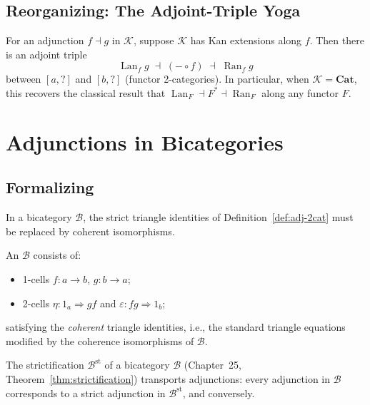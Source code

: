 \subsection{Reorganizing: The Adjoint-Triple Yoga}

\begin{theorem}
\label{thm:adj-triple}
For an adjunction $f \dashv g$ in $\mathcal{K}$, suppose $\mathcal{K}$ has
Kan extensions along $f$. Then there is an adjoint triple
\begin{equation*}
  \operatorname{Lan}_f g \;\dashv\; (- \circ f) \;\dashv\; \operatorname{Ran}_f g
\end{equation*}
between $[a, ?]$ and $[b, ?]$ (functor 2-categories). In particular, when
$\mathcal{K} = \mathbf{Cat}$, this recovers the classical result that
$\operatorname{Lan}_F \dashv F^* \dashv \operatorname{Ran}_F$ along any
functor $F$.
\end{theorem}


\section{Adjunctions in Bicategories}
\label{sec:adj-bicat}

\subsection{Formalizing}

In a bicategory $\mathcal{B}$, the strict triangle identities of
Definition~\ref{def:adj-2cat} must be replaced by coherent isomorphisms.

\begin{definition}
\label{def:adj-bicat}
An  $\mathcal{B}$ consists of:
\begin{itemize}
  \item 1-cells $f : a \to b$, $g : b \to a$;
  \item 2-cells $\eta : 1_a \Rightarrow gf$ and $\varepsilon : fg
        \Rightarrow 1_b$;
\end{itemize}
satisfying the \emph{coherent} triangle identities, i.e., the standard
triangle equations modified by the coherence isomorphisms of $\mathcal{B}$.
\end{definition}

\begin{theorem}
\label{thm:adj-strictify}
The strictification $\mathcal{B}^{\mathrm{st}}$ of a bicategory $\mathcal{B}$
(Chapter~25, Theorem~\ref{thm:strictification}) transports adjunctions:
every adjunction in $\mathcal{B}$ corresponds to a strict adjunction in
$\mathcal{B}^{\mathrm{st}}$, and conversely.
\end{theorem}

